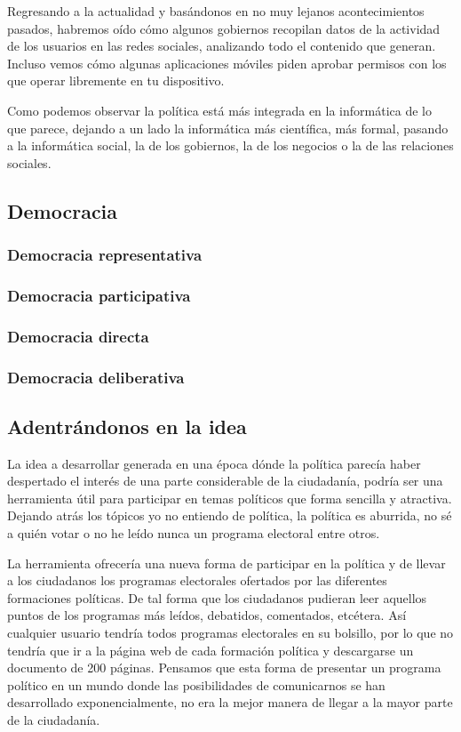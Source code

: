 Regresando a la actualidad y basándonos en no muy lejanos acontecimientos pasados, habremos oído cómo algunos gobiernos recopilan datos de la actividad de los usuarios en las redes sociales, analizando todo el contenido que generan. Incluso vemos cómo algunas aplicaciones móviles piden aprobar permisos con los que operar libremente en tu dispositivo.

Como podemos observar la política está más integrada en la informática de lo que parece, dejando a un lado la informática más científica, más formal, pasando a la informática social, la de los gobiernos, la de los negocios o la de las relaciones sociales.

\subsection{Democracia}

\subsubsection{Democracia representativa}

\subsubsection{Democracia participativa}

\subsubsection{Democracia directa}

\subsubsection{Democracia deliberativa}


\subsection{Adentrándonos en la idea}
La idea a desarrollar generada en una época dónde la política parecía haber despertado el interés de una parte considerable de la ciudadanía, podría ser una herramienta útil para participar en temas políticos que forma sencilla y atractiva. Dejando atrás los tópicos yo no entiendo de política, la política es aburrida, no sé a quién votar o no he leído nunca un programa electoral entre otros.

La herramienta ofrecería una nueva forma de participar en la política y de llevar a los ciudadanos los programas electorales ofertados por las diferentes formaciones políticas. De tal forma que los ciudadanos pudieran leer aquellos puntos de los programas más leídos, debatidos, comentados, etcétera. Así cualquier usuario tendría todos programas electorales en su bolsillo, por lo que no tendría que ir a la página web de cada formación política y descargarse un documento de 200 páginas. Pensamos que esta forma de presentar un programa político en un mundo donde las posibilidades de  comunicarnos se han desarrollado exponencialmente, no era la mejor manera de llegar a la mayor parte de la ciudadanía.

